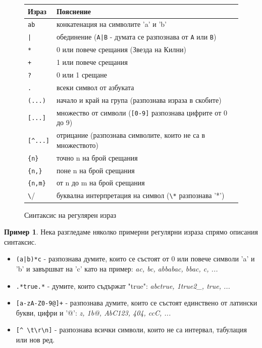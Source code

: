 \documentclass[12pt, oneside]{article}
\theoremstyle{definition}
\newtheorem{example}{Пример}[section]
\begin{document}
\begin{figure}[!htb]
	\begin{center}
		\begin{tabular}{ |l|l| } 
		\hline
		Израз & Пояснение \\
		\hline
		\verb/ab/ & конкатенация на символите 'a' и 'b' \\
		\verb/|/ & обединение (\verb/A|B/ - думата се разпознава от \verb/A/ или \verb/B/) \\
		\verb/*/ & 0 или повече срещания (Звезда на Килни) \\
		\verb/+/ & 1 или повече срещания \\
		\verb/?/ & 0 или 1 срещане \\
		\verb/./ & всеки символ от азбуката \\
		\verb/(...)/ & начало и край на група (разпознава израза в скобите) \\
		\verb/[...]/ & множество от символи (\verb/[0-9]/ разпознава цифрите от 0 до 9) \\
		\verb/[^...]/ & отрицание (разпознава символите, които не са в множеството) \\
		\verb/{n}/ & точно n на брой срещания \\
		\verb/{n,}/ & поне n на брой срещания \\
		\verb/{n,m}/ & от n до m на брой срещания \\
		\verb/\/ & буквална интерпретация на символ (\verb/\*/ разпознава '*') \\
		\hline
		\end{tabular}
	\end{center}
	\label{fig:RegExSyntax}
	\caption{Синтаксис на регулярен израз}
\end{figure}

\begin{example}
	Нека разгледаме няколко примерни регулярни израза спрямо описания синтаксис.
	\begin{itemize}
		\item \verb/(a|b)*c/ - разпознава думите, които се състоят от 0 или повече символи 'a' и 'b' и завършват на 'c' като на пример: \emph{ac, bc, abbabac, bbac, c, ...}
		\item \verb/.*true.*/ - думите, които съдържат "true": \emph{abctrue, 1true2_, true, ...}
		\item \verb/[a-zA-Z0-9@]+/ - разпознава думите, които се състоят единствено от латински букви, цифри и '@': \emph{z, 1b@, AbC123, 404, ccC, ...}
		\item \verb/[^ \t\r\n]/ - разпознава всички символи, които не са интервал, табулация или нов ред.
	\end{itemize}
\end{example}
\end{document}
